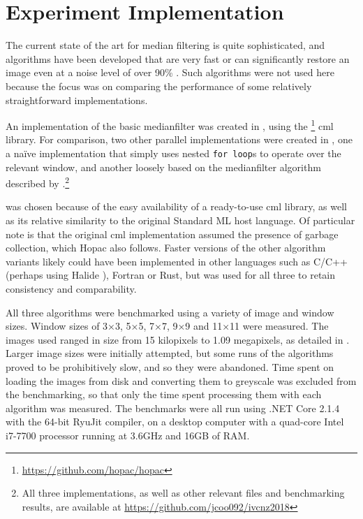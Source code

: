 \section{ Experiment Implementation}

The current state of the art for median filtering is quite sophisticated, and algorithms have been developed that are very fast \cite{Sanchez2012,Perrot2014} or can significantly restore an image even at a noise level of over 90\% \cite{Gao2015,Wu2011}.  Such algorithms were not used here because the focus was on comparing the performance of some relatively straightforward implementations.

An implementation of the basic \gls{medianfilter} was created in \fsharp{}, using the \hopac{}\footnote{\url{https://github.com/hopac/hopac}} \gls{cml} library.  For comparison, two other parallel implementations were created in \fsharp{}, one a naïve implementation that simply uses nested \texttt{for loop}s to operate over the relevant window, and another loosely based on the \gls{medianfilter} algorithm described by \citeauthor{Braunl2001} \cite{Braunl2001}.\footnote{All three implementations, as well as other relevant files and benchmarking results, are available at \url{https://github.com/jcoo092/ivcnz2018}}

\fsharp{} was chosen because of the easy availability of a ready-to-use \gls{cml} library, as well as its relative similarity to the original Standard ML host language.  Of particular note is that the original \gls{cml} implementation assumed the presence of garbage collection, which Hopac also follows.  Faster versions of the other algorithm variants likely could have been implemented in other languages such as C/C++ (perhaps using Halide \cite{Ragan-Kelley2017}), Fortran or Rust, but \fsharp{} was used for all three to retain consistency and comparability.  

All three algorithms were benchmarked using a variety of image and window sizes.  Window sizes of 3×3, 5×5, 7×7, 9×9 and 11×11 were measured.  The images used ranged in size from 15 kilopixels to 1.09 megapixels, as detailed in .  Larger image sizes were initially attempted, but some runs of the algorithms proved to be prohibitively slow, and so they were abandoned.  Time spent on loading the images from disk and converting them to greyscale was excluded from the benchmarking, so that only the time spent processing them with each algorithm was measured.  The benchmarks were all run using .NET Core 2.1.4 with the 64-bit RyuJit compiler, on a desktop computer with a quad-core Intel i7-7700 processor running at 3.6GHz and 16GB of RAM.


